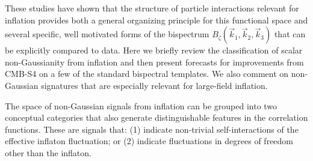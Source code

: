 These studies have shown that the structure of particle interactions relevant for inflation provides both a general organizing principle for this functional space and several specific, well motivated forms of the bispectrum $B_{\zeta}(\vec{k}_1,\vec{k}_2,\vec{k}_3)$ that can be explicitly compared to data. Here we briefly review the classification of scalar non-Gaussianity from inflation and then present forecasts for improvements from CMB-S4 on a few of the standard bispectral templates. We also comment on non-Gaussian signatures that are especially relevant for large-field inflation.

The space of non-Gaussian signals from inflation can be grouped into two conceptual categories that also generate distinguishable features in the correlation functions. These are signals that: (1) indicate non-trivial self-interactions of the effective inflaton fluctuation; or (2) indicate fluctuations in degrees of freedom other than the inflaton. 

